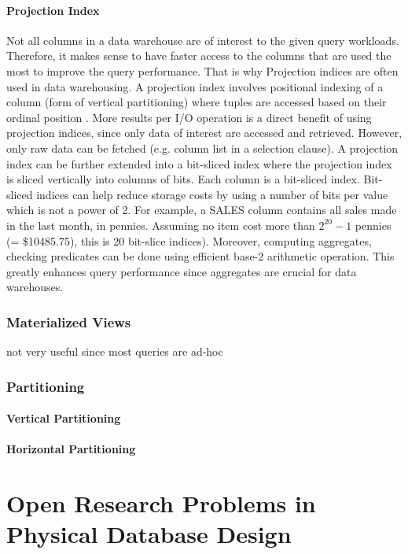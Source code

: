 \documentclass[12pt,a4paper]{article}
\begin{document}
\paragraph{Projection Index}
Not all columns in a data warehouse are of interest to the given query workloads. Therefore, it makes sense to have faster access to the columns that are used
the most to improve the query performance. That is why Projection indices are often used in data warehousing. A projection index involves positional indexing
of a column (form of vertical partitioning) where tuples are accessed based on their ordinal position \cite{datta2002parallel}. More results per I/O operation
is a direct benefit of using projection indices, since only data of interest are accessed and retrieved. However, only raw data can be fetched (e.g. column
list in a selection clause). A projection index can be further extended into a bit-sliced index \cite{oneil1997improved} where the projection index is sliced
vertically into columns of bits. Each column is a bit-sliced index. Bit-sliced indices can help reduce storage costs by using a number of bits per value which
is not a power of 2. For example, a SALES column contains all sales made in the last month, in pennies. Assuming no item cost more than $2^{20} - 1$ pennies (=
\$10485.75), this is 20 bit-slice indices). Moreover, computing aggregates, checking predicates can be done using efficient base-2 arithmetic operation. This
greatly enhances query performance since aggregates are crucial for data warehouses.

\subsubsection{Materialized Views}
not very useful since most queries are ad-hoc \cite{armstrong1997data, theodoratos2000general}

\subsubsection{Partitioning}
\cite{thusoo2010data}
\paragraph{Vertical Partitioning}

\paragraph{Horizontal Partitioning}

\section{Open Research Problems in Physical Database Design}
\label{SEC-OPEN}
\end{document}
